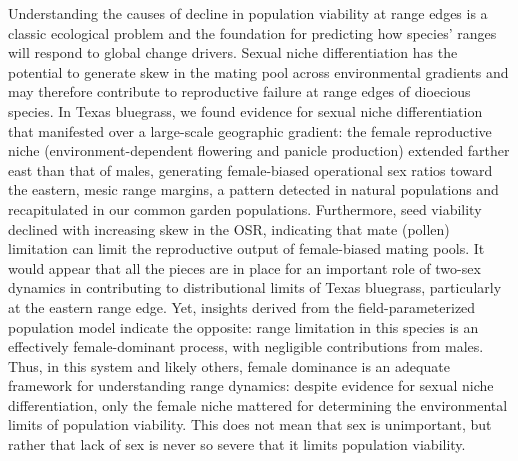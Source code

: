 \documentclass[11pt]{article}\usepackage[]{graphicx}\usepackage[]{color}
\begin{document}
Understanding the causes of decline in population viability at range edges is a classic ecological problem and the foundation for predicting how species' ranges will respond to global change drivers. 
Sexual niche differentiation has the potential to generate skew in the mating pool across environmental gradients and may therefore contribute to reproductive failure at range edges of dioecious species. 
In Texas bluegrass, we found evidence for sexual niche differentiation that manifested over a large-scale geographic gradient: the female reproductive niche (environment-dependent flowering and panicle production) extended farther east than that of males, generating female-biased operational sex ratios toward the eastern, mesic range margins, a pattern detected in natural populations and recapitulated in our common garden populations. 
Furthermore, seed viability declined with increasing skew in the OSR, indicating that mate (pollen) limitation can limit the reproductive output of female-biased mating pools. 
It would appear that all the pieces are in place for an important role of two-sex dynamics in contributing to distributional limits of Texas bluegrass, particularly at the eastern range edge. 
Yet, insights derived from the field-parameterized population model indicate the opposite: range limitation in this species is an effectively female-dominant process, with negligible contributions from males. 
Thus, in this system and likely others, female dominance is an adequate framework for understanding range dynamics: despite evidence for sexual niche differentiation, only the female niche mattered for determining the environmental limits of population viability. 
This does not mean that sex is unimportant, but rather that lack of sex is never so severe that it limits population viability. 
\end{document}
